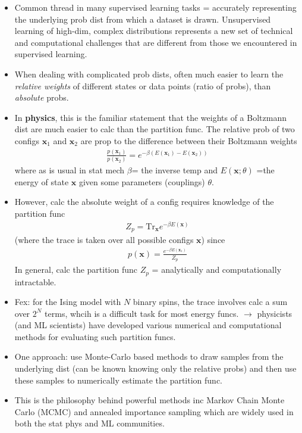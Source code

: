 \documentclass[norsk,a4paper,11pt]{article}
\begin{document}
\begin{itemize}
	\item Common thread in many supervised learning tasks = accurately representing the underlying prob dist from which a dataset is drawn. Unsupervised learning of high-dim, complex distributions represents a new set of technical and computational challenges that are different from those we encountered in supervised learning.
	\item When dealing with complicated prob dists, often much easier to learn the \textit{relative weights} of different states or data points (ratio of probs), than \textit{absolute} probs.
	\item In \textbf{physics}, this is the familiar statement that the weights of a Boltzmann dist are much easier to calc than the partition func. The relative prob of two configs $\bm{x}_1$ and $\bm{x}_2$ are prop to the difference between their Boltzmann weights
	\begin{align}
		\frac{p(\bm{x}_1)}{p(\bm{x}_2)} = e^{-\beta (E(\bm{x}_1) - E(\bm{x}_2))}
	\end{align}
	where as is usual in stat mech $\beta$= the inverse temp and $E(\bm{x}; \theta)$ =the energy of state $\bm{x}$ given some parameters (couplings) $\theta$.
	\item However, calc the absolute weight of a config requires knowledge of the partition func
	\begin{align}
		Z_p = \text{Tr}_{\bm{x}} e^{-\beta E(\bm{x})}
	\end{align}
	(where the trace is taken over all possible configs $\bm{x}$) since
	\begin{align}
		p(\bm{x}) = \frac{e^{-\beta E(\bm{x}_1)}}{Z_p}
	\end{align}
	In general, calc the partition func $Z_p$ = analytically and computationally intractable.
	\item Fex: for the Ising model with $N$ binary spins, the trace involves calc a sum over $2^N$ terms, whcih is a difficult task for most energy funcs. $\rightarrow$ physicists (and ML scientists) have developed various numerical and computational methods for evaluating such partition funcs. 
	\item One approach: use Monte-Carlo based methods to draw samples from the underlying dist (can be known knowing only the relative probs) and then use these samples to numerically estimate the partition func.
	\item This is the philosophy behind powerful methods inc Markov Chain Monte Carlo (MCMC) and annealed importance sampling which are widely used in both the stat phys and ML communities.

\end{itemize}
\end{document}
